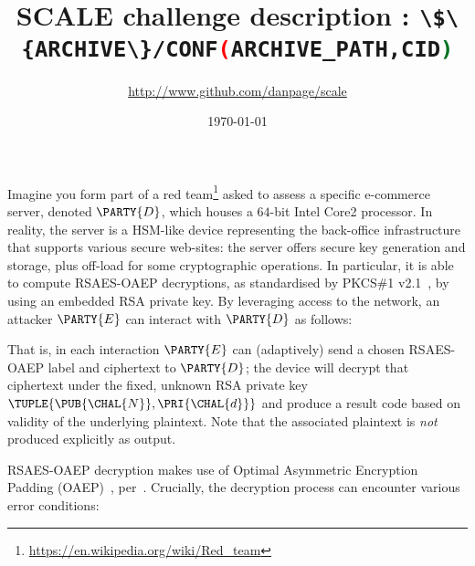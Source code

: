 \documentclass[crop={false},multi={true},tikz={true}]{standalone}
\begin{document}

\ifstandalone
\author{\url{http://www.github.com/danpage/scale}}
\title{\Large SCALE challenge description : \lstinline[language={bash}]|\$\{ARCHIVE\}/CONF(ARCHIVE_PATH,CID)|}
\date{\today}

\maketitle
\fi



Imagine you form part of a red team\footnote{
\url{https://en.wikipedia.org/wiki/Red_team}
} asked to assess a specific e-commerce server, denoted $\PARTY{D}$, 
which houses a $64$-bit Intel Core2 processor.  
In reality, the server is a HSM-like device representing the back-office 
infrastructure that supports various secure web-sites: the server offers
secure key generation and storage, plus off-load for some cryptographic 
operations.  In particular, it is able to compute RSAES-OAEP decryptions, 
as standardised by PKCS\#1 v2.1~\cite{SCALE:RFC:3447}, by using an 
embedded RSA private key.
By leveraging access to the network, 
an attacker $\PARTY{E}$ can interact with $\PARTY{D}$ as follows:

\begin{center}

\end{center}

\noindent
That is, in each interaction $\PARTY{E}$ can (adaptively) send 
a chosen RSAES-OAEP label and ciphertext
to $\PARTY{D}$; the device will
decrypt that ciphertext under the fixed, unknown RSA private key $\TUPLE{ \PUB{\CHAL{N}}, \PRI{\CHAL{d}} }$ 
and produce 
a result code based on validity of the underlying  plaintext.
Note that the associated  plaintext is {\em not} produced explicitly as
output.

RSAES-OAEP decryption makes use of Optimal Asymmetric Encryption Padding 
(OAEP)~\cite{SCALE:BelRog:94}, per~\cite[Section 7.1]{SCALE:RFC:3447}.  
Crucially, the decryption process can encounter various error conditions:
\end{document}
